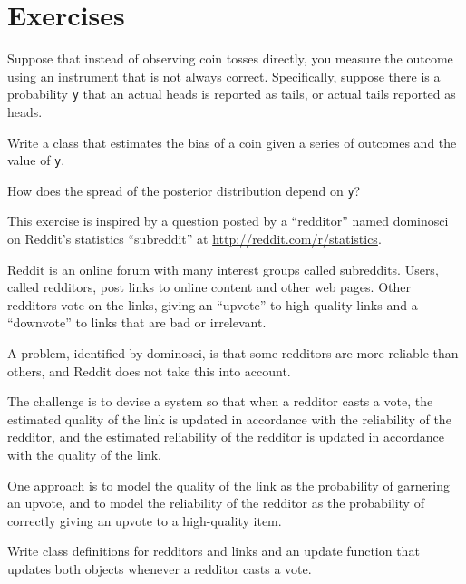 \documentclass[12pt]{book}
\begin{document}
\section{Exercises}

\begin{exercise}

Suppose that instead of observing coin tosses directly, you measure
the outcome using an instrument that is not always correct.  Specifically,
suppose there is a probability {\tt y} that an actual heads is reported
as tails, or actual tails reported as heads.

Write a class that estimates the bias of a coin given a series of
outcomes and the value of {\tt y}.

How does the spread of the posterior distribution depend on
{\tt y}?

\end{exercise}


\begin{exercise}

This exercise is inspired by a question posted by a
``redditor'' named dominosci on Reddit's statistics ``subreddit'' at
\url{http://reddit.com/r/statistics}.

Reddit is an online forum with many interest groups called
subreddits.  Users, called redditors, post links to online
content and other web pages.  Other redditors vote on the links,
giving an ``upvote'' to high-quality links and a ``downvote'' to
links that are bad or irrelevant.

A problem, identified by dominosci, is that some redditors
are more reliable than others, and Reddit does not take
this into account.

The challenge is to devise a system so that when a redditor
casts a vote, the estimated quality of the link is updated
in accordance with the reliability of the redditor, and the
estimated reliability of the redditor is updated in accordance
with the quality of the link.

One approach is to model the quality of the link as the
probability of garnering an upvote, and to model the reliability
of the redditor as the probability of correctly giving an upvote
to a high-quality item.

Write class definitions for redditors and links and an update function
that updates both objects whenever a redditor casts a vote.

\end{exercise}
\end{document}
